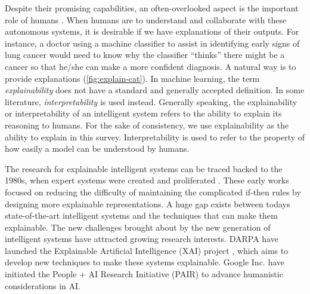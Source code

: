 Despite their promising capabilities, an often-overlooked aspect is the important role of humans \cite{ribeiro2016kdd}. When humans are to understand and collaborate with these autonomous systems, it is desirable if we have explanations of their outputs. For instance, a doctor using a machine classifier to assist in identifying early signs of lung cancer would need to know why the classifier ``thinks'' there might be a cancer so that he/she can make a more confident diagnosis. A natural way is to provide explanations (\autoref{fig:explain-cat}). In machine learning, the term \textit{explainability} does not have a standard and generally accepted definition. In some literature, \textit{interpretability} is used instead. Generally speaking, the explainability or interpretability of an intelligent system refers to the ability to explain its reasoning \cite{doshi-velez2017interpretableml} to humans. For the sake of consistency, we use explainability as the ability to explain in this survey. Interpretability is used to refer to the property of how easily a model can be understood by humans.

The research for explainable intelligent systems can be traced backed to the 1980s, when expert systems were created and proliferated \cite{clancey1981tech, neches1985tse, swartout1991expert}. These early works focused on reducing the difficulty of maintaining the complicated if-then rules by designing more explainable representations. A huge gap exists between todays state-of-the-art intelligent systems and the techniques that can make them explainable. The new challenges brought about by the new generation of intelligent systems have attracted growing research interests. DARPA have launched the Explainable Artificial Intelligence (XAI) project \cite{darpa2017xai}, which aims to develop new techniques to make these systems explainable. Google Inc. have initiated the People + AI Research Initiative (PAIR) \cite{google2017pair} to advance humanistic considerations in AI. 


